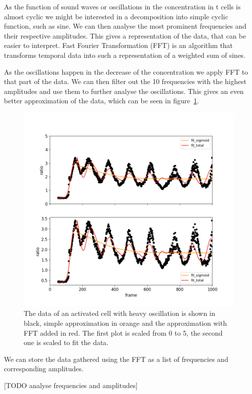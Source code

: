 As the function of sound waves or oscillations in the \Calcium concentration in t cells is almost cyclic we might be interested in a decomposition into simple cyclic function, such as sine. We can then analyse the most prominent frequencies and their respective amplitudes. This gives a representation of the data, that can be easier to interpret. Fast Fourier Transformation (FFT) is an algorithm that transforms temporal data into such a representation of a weighted sum of sines.

As the oscillations happen in the decrease of the \Calcium concentration we apply FFT to that part of the data. We can then filter out the 10 frequencies with the highest amplitudes and use them to further analyse the oscillations. This gives an even better approximation of the data, which can be seen in figure~\ref{fig:particle_vis_fft_approx}.

\begin{figure}
	\centering
	\includegraphics[width=\textwidth]{fig/particle_vis_fft_approx_pos}
	
	\caption{The data of an activated cell with heavy oscillation is shown in black, simple approximation in orange and the approximation with FFT added in red. The first plot is scaled from 0 to 5, the second one is scaled to fit the data.}
	\label{fig:particle_vis_fft_approx}
\end{figure}

We can store the data gathered using the FFT as a list of frequencies and corresponding amplitudes.

[TODO analyse frequencies and amplitudes]

